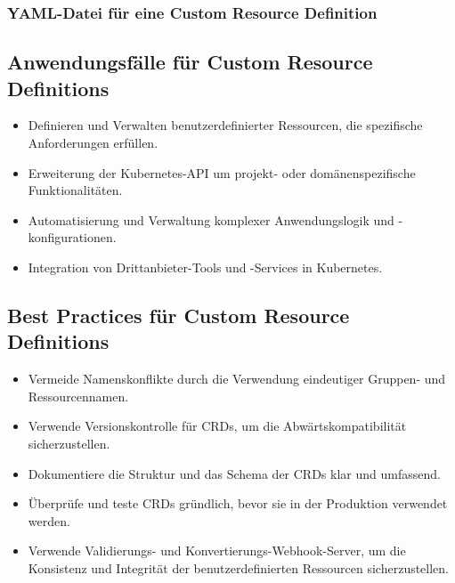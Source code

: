 \subsubsection{YAML-Datei für eine Custom Resource Definition}


\subsection{Anwendungsfälle für Custom Resource Definitions}
\begin{itemize}
    \item Definieren und Verwalten benutzerdefinierter Ressourcen, die spezifische Anforderungen erfüllen.
    \item Erweiterung der Kubernetes-API um projekt- oder domänenspezifische Funktionalitäten.
    \item Automatisierung und Verwaltung komplexer Anwendungslogik und -konfigurationen.
    \item Integration von Drittanbieter-Tools und -Services in Kubernetes.
\end{itemize}

\subsection{Best Practices für Custom Resource Definitions}
\begin{itemize}
    \item Vermeide Namenskonflikte durch die Verwendung eindeutiger Gruppen- und Ressourcennamen.
    \item Verwende Versionskontrolle für CRDs, um die Abwärtskompatibilität sicherzustellen.
    \item Dokumentiere die Struktur und das Schema der CRDs klar und umfassend.
    \item Überprüfe und teste CRDs gründlich, bevor sie in der Produktion verwendet werden.
    \item Verwende Validierungs- und Konvertierungs-Webhook-Server, um die Konsistenz und Integrität der benutzerdefinierten Ressourcen sicherzustellen.
\end{itemize}

